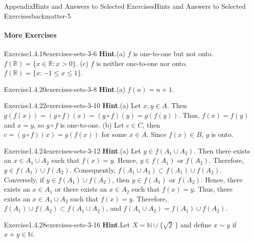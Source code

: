 \documentclass[oneside,10pt,]{book}
\newcommand{\blocktitlefont}{\relax}
\numberwithin{equation}{section}
\newcommand{\gt}{>}
\begin{document}
\begin{solutions-chapter}{Appendix}{Hints and Answers to Selected Exercises}{}{Hints and Answers to Selected Exercises}{}{}{backmatter-5}
\paragraph[{More Exercises}]{More Exercises}
\begin{divisionsolution}{Exercise}{1.4.18}{}{exercises-sets-3-6}%
\noindent\textbf{\blocktitlefont Hint}.\hypertarget{exercises-sets-3-6-2-back}{}\quad{}(a) \(f\) is one-to-one but not onto. \(f({\mathbb R} ) = \{ x \in {\mathbb R} : x \gt 0 \}\).  (c) \(f\) is neither one-to-one nor onto.  \(f(\mathbb R) = \{ x : -1 \leq x \leq 1 \}\).%
\end{divisionsolution}%
\begin{divisionsolution}{Exercise}{1.4.20}{}{exercises-sets-3-8}%
\noindent\textbf{\blocktitlefont Hint}.\hypertarget{exercises-sets-3-8-2-back}{}\quad{}(a) \(f(n) = n + 1\).%
\end{divisionsolution}%
\begin{divisionsolution}{Exercise}{1.4.22}{}{exercises-sets-3-10}%
\noindent\textbf{\blocktitlefont Hint}.\hypertarget{exercises-sets-3-10-2-back}{}\quad{}(a) Let \(x, y \in A\). Then \(g(f(x)) = (g \circ f)(x) = (g \circ f)(y) = g(f(y))\).  Thus, \(f(x) = f(y)\) and \(x = y\),  so \(g \circ f\) is one-to-one. (b) Let \(c \in C\), then \(c = (g \circ f)(x) = g(f(x))\) for some \(x \in A\). Since \(f(x) \in B\), \(g\) is onto.%
\end{divisionsolution}%
\begin{divisionsolution}{Exercise}{1.4.24}{}{exercises-sets-3-12}%
\noindent\textbf{\blocktitlefont Hint}.\hypertarget{exercises-sets-3-12-2-back}{}\quad{}(a) Let \(y \in f(A_1 \cup A_2)\).  Then there exists an \(x \in A_1 \cup A_2\) such that \(f(x) = y\).  Hence, \(y \in f(A_1)\) or \(f(A_2) \).  Therefore, \(y \in f(A_1) \cup f(A_2)\). Consequently, \(f(A_1 \cup A_2) \subset f(A_1) \cup f(A_2)\). Conversely, if \(y \in f(A_1) \cup f(A_2)\), then \(y \in f(A_1)\) or \(f(A_2)\).  Hence, there exists an \(x \in A_1\) or there exists an \(x \in A_2\) such that \(f(x) = y\).  Thus, there exists an \(x \in A_1 \cup A_2\) such that \(f(x) = y\).  Therefore, \(f(A_1) \cup f(A_2) \subset f(A_1 \cup A_2)\), and \(f(A_1 \cup A_2) = f(A_1) \cup f(A_2)\).%
\end{divisionsolution}%
\begin{divisionsolution}{Exercise}{1.4.28}{}{exercises-sets-3-16}%
\noindent\textbf{\blocktitlefont Hint}.\hypertarget{exercises-sets-3-16-2-back}{}\quad{}Let \(X = {\mathbb N} \cup \{ \sqrt{2}\, \}\) and define \(x \sim y\) if \(x + y \in {\mathbb N}\).%

\end{divisionsolution}
\end{solutions-chapter}
\end{document}
